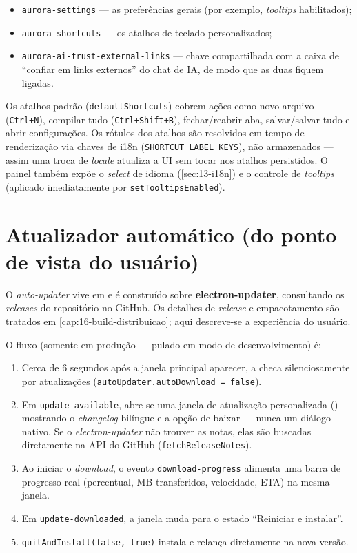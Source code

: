 \begin{itemize}[leftmargin=*]
  \item \lstinline|aurora-settings| — as preferências gerais (por exemplo,
        \textit{tooltips} habilitados);
  \item \lstinline|aurora-shortcuts| — os atalhos de teclado personalizados;
  \item \lstinline|aurora-ai-trust-external-links| — chave compartilhada com a
        caixa de \enquote{confiar em links externos} do chat de IA, de modo que
        as duas fiquem ligadas.
\end{itemize}

Os atalhos padrão (\lstinline|defaultShortcuts|) cobrem ações como novo arquivo
(\lstinline|Ctrl+N|), compilar tudo (\lstinline|Ctrl+Shift+B|), fechar/reabrir
aba, salvar/salvar tudo e abrir configurações. Os rótulos dos atalhos são
resolvidos em tempo de renderização via chaves de i18n
(\lstinline|SHORTCUT_LABEL_KEYS|), não armazenados — assim uma troca de
\textit{locale} atualiza a UI sem tocar nos atalhos persistidos. O painel também
expõe o \textit{select} de idioma (\autoref{sec:13-i18n}) e o controle de
\textit{tooltips} (aplicado imediatamente por \lstinline|setTooltipsEnabled|).

\section{Atualizador automático (do ponto de vista do usuário)}
\label{sec:13-updater}

O \textit{auto-updater} vive em  e é construído sobre
\textbf{electron-updater}, consultando os \textit{releases} do repositório
 no GitHub. Os detalhes de \textit{release} e empacotamento são
tratados em \autoref{cap:16-build-distribuicao}; aqui descreve-se a experiência do usuário.

O fluxo (somente em produção — pulado em modo de desenvolvimento) é:

\begin{enumerate}[leftmargin=*]
  \item Cerca de 6 segundos após a janela principal aparecer, a 
        checa silenciosamente por atualizações
        (\lstinline|autoUpdater.autoDownload = false|).
  \item Em \lstinline|update-available|, abre-se uma janela de atualização
        personalizada () mostrando o
        \textit{changelog} bilíngue e a opção de baixar — nunca um diálogo
        nativo. Se o \textit{electron-updater} não trouxer as notas, elas são
        buscadas diretamente na API do GitHub (\lstinline|fetchReleaseNotes|).
  \item Ao iniciar o \textit{download}, o evento \lstinline|download-progress|
        alimenta uma barra de progresso real (percentual, MB transferidos,
        velocidade, ETA) na mesma janela.
  \item Em \lstinline|update-downloaded|, a janela muda para o estado
        \enquote{Reiniciar e instalar}.
  \item \lstinline|quitAndInstall(false, true)| instala e relança diretamente
        na nova versão.
\end{enumerate}

